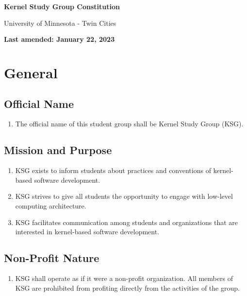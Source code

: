 \documentclass[12pt,executivepaper]{article}
\begin{document}
\begin{center}
    \Large
    \textbf{Kernel Study Group Constitution}

    \smallskip

    \large
    University of Minnesota - Twin Cities

    \smallskip

    \normalsize
    \textbf{Last amended: January 22, 2023}
\end{center}

\section{General}

\subsection{Official Name}
\begin{enumerate}
    \item The official name of this student group shall be Kernel Study Group (KSG).
\end{enumerate}

\subsection{Mission and Purpose}
\begin{enumerate}
    \item KSG exists to inform students about practices and conventions of kernel-based
          software development.
    \item KSG strives to give all students the opportunity to engage with low-level computing
          architecture.
    \item KSG facilitates communication among students and organizations that are interested
          in kernel-based software development.
\end{enumerate}

\subsection{Non-Profit Nature}
\begin{enumerate}
    \item KSG shall operate as if it were a non-profit organization. All members
          of KSG are prohibited from profiting directly from the activities of
          the group.
\end{enumerate}
\end{document}
